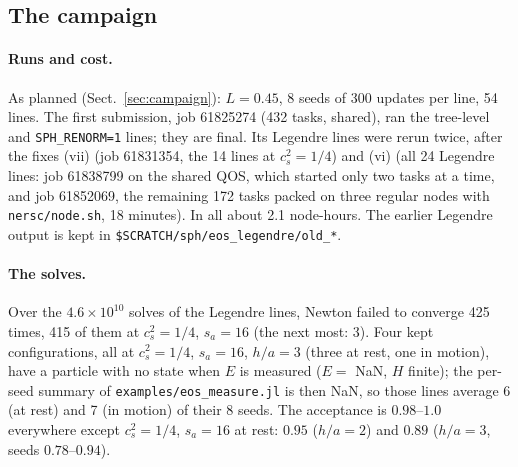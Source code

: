 \documentclass[11pt,aps,preprint,nofootinbib,superscriptaddress,tightenlines]{revtex4-2}
\def\Sect#1{Sect.~\ref{#1}}
\let\oldparagraph\paragraph
\renewcommand{\paragraph}{\par\bigskip\oldparagraph}
\begin{document}
\subsection{The campaign}

\paragraph{Runs and cost.}  As planned (\Sect{sec:campaign}): $L=0.45$, 8 seeds of 300 updates per line, 54 lines.  The first submission, job
61825274 (432 tasks, shared), ran the tree-level and \texttt{SPH\_RENORM=1} lines; they are final.  Its Legendre lines were rerun twice, after the fixes
(vii) (job 61831354, the 14 lines at $c_s^2=1/4$) and (vi) (all 24 Legendre lines: job 61838799 on the shared QOS, which started only two tasks at a
time, and job 61852069, the remaining 172 tasks packed on three regular nodes with \nolinkurl{nersc/node.sh}, 18 minutes).  In all about 2.1 node-hours.
The earlier Legendre output is kept in \texttt{\$SCRATCH/sph/eos\_legendre/old\_*}.

\paragraph{The solves.}  Over the $4.6\times10^{10}$ solves of the Legendre lines, Newton failed to converge 425 times, 415 of them at $c_s^2=1/4$,
$s_a=16$ (the next most: 3).  Four kept configurations, all at $c_s^2=1/4$, $s_a=16$, $h/a=3$ (three at rest, one in motion), have a particle with no
state when $E$ is measured ($E=$ NaN, $H$ finite); the per-seed summary of \nolinkurl{examples/eos_measure.jl} is then NaN, so those lines average 6 (at
rest) and 7 (in motion) of their 8 seeds.  The acceptance is $0.98$--$1.0$ everywhere except $c_s^2=1/4$, $s_a=16$ at rest: $0.95$ ($h/a=2$) and
$0.89$ ($h/a=3$, seeds $0.78$--$0.94$).
\end{document}
